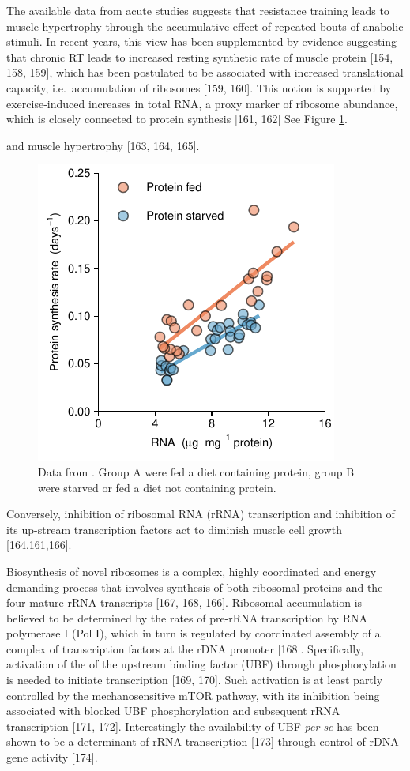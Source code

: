 \documentclass[twoside,10pt]{gihclass} %
\begin{document}
The available data from acute studies suggests that resistance training leads to muscle hypertrophy through the accumulative effect of repeated bouts of anabolic stimuli. In recent years, this view has been supplemented by evidence suggesting that chronic RT leads to increased resting synthetic rate of muscle protein
{[}154, 158, 159{]},
which has been postulated to be associated with increased translational capacity, i.e.~accumulation of ribosomes
{[}159, 160{]}.
This notion is supported by exercise-induced increases in total RNA, a proxy marker of ribosome abundance, which is closely connected to protein synthesis
{[}161, 162{]}
See Figure \ref{fig:Millward1973}.

and muscle hypertrophy
{[}163, 164, 165{]}.
\begin{figure}
\includegraphics{thesis_files/figure-latex/Millward1973-1} \caption[Relationship between RNA content and protein synthesis in rat skeletal muscle, data from \citep{@RN2145}]{Data from \citep{@RN2145}. Group A were fed a diet containing protein, group B were starved or fed a diet not containing protein.}\label{fig:Millward1973}
\end{figure}
Conversely, inhibition of ribosomal RNA (rRNA) transcription and inhibition of its up-stream transcription factors act to diminish muscle cell growth
{[}164,161,166{]}.

Biosynthesis of novel ribosomes is a complex, highly coordinated and energy demanding process that involves synthesis of both ribosomal proteins and the four mature rRNA transcripts
{[}167, 168, 166{]}.
Ribosomal accumulation is believed to be determined by the rates of pre-rRNA transcription by RNA polymerase I (Pol I), which in turn is regulated by coordinated assembly of a complex of transcription factors at the rDNA promoter
{[}168{]}.
Specifically, activation of the of the upstream binding factor (UBF) through phosphorylation is needed to initiate transcription
{[}169, 170{]}.
Such activation is at least partly controlled by the mechanosensitive mTOR pathway, with its inhibition being associated with blocked UBF phosphorylation and subsequent rRNA transcription
{[}171, 172{]}.
Interestingly the availability of UBF \emph{per se} has been shown to be a determinant of rRNA transcription
{[}173{]}
through control of rDNA gene activity
{[}174{]}.
\end{document}
